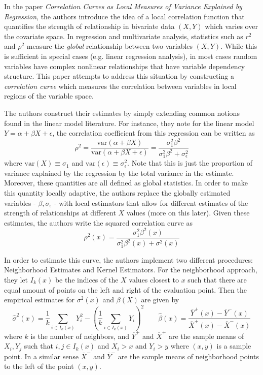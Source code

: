 \documentclass[12pt]{article}  %
\begin{document}
\newpage

In the paper \textit{Correlation Curves as Local Measures of Variance Explained by Regression}, the authors introduce the idea of a local correlation function that quantifies the strength of relationship in bivariate data $(X,Y)$ which varies over the covariate space. In regression and multivariate analysis, statistics such as $r^2$ and $\rho^2$ measure the \textit{global} relationship between two variables $(X,Y)$. While this is sufficient in special cases (e.g. linear regression analysis), in most cases random variables have complex nonlinear relationships that have variable dependency structure. This paper attempts to address this situation by constructing a \textit{correlation curve} which measures the correlation between variables in local regions of the variable space. 

The authors construct their estimates by simply extending common notions found in the linear model literature. For instance, they note for the linear model $Y = \alpha +\beta X +\epsilon$, the correlation coefficient from this regression can be written as $$\rho^2 = \frac{\text{var}(\alpha + \beta X)}{\text{var}(\alpha + \beta X + \epsilon)} = \frac{\sigma_1^2\beta^2}{\sigma_1^2\beta^2 + \sigma_{\epsilon}^2}$$ where $\text{var}(X) \equiv \sigma_1$ and $\text{var}(\epsilon)\equiv \sigma_{\epsilon}^2$. Note that this is just the proportion of variance explained by the regression by the total variance in the estimate. Moreover, these quantities are all defined as global statistics. In order to make this quantity locally adaptive, the authors replace the globally estimated variables - $\beta, \sigma_{\epsilon}$ - with local estimators that allow for different estimates of the strength of relationships at different $X$ values (more on this later). Given these estimates, the authors write the squared correlation curve as $$\rho^2(x) = \frac{\sigma_1^2\beta^2(x)}{\sigma_1^2\beta^2(x) + \sigma^2(x)}$$

In order to estimate this curve, the authors implement two different procedures: Neighborhood Estimates and Kernel Estimators. For the neighborhood approach, they let $I_k(x)$ be the indices of the $X$ values closest to $x$ such that there are equal amount of points on the left and right of the evaluation point. Then the empirical estimates for $\sigma^2(x)$ and $\beta(X)$ are given by $$\hat{\sigma}^2(x) = \frac{1}{k}\sum_{i\in I_k(x)}Y_i^2 - \left(\frac{1}{k}\sum_{i\in I_k(x)}Y_i\right)^2 \hspace{2em} \hat{\beta}(x) = \frac{\overline{Y}^{+}(x) -\overline{Y}^{-}(x)}{\overline{X}^{+}(x) -\overline{X}^{-}(x)}$$
where $k$ is the number of neighbors, and $\overline{Y}^{+}$ and $\overline{X}^{+}$ are the sample means of $X_i, Y_j$ such that $i,j\in I_k(x)$ and $X_i>x$ and $Y_i > y$ where $(x,y)$ is a sample point. In a similar sense $\overline{X}^{-}$ and $\overline{Y}^{-}$ are the sample means of neighborhood points to the left of the point $(x,y)$.
\end{document}

